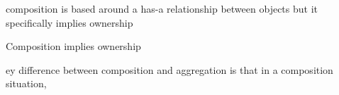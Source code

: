 composition is based around a has-a relationship between objects but it specifically implies ownership

Composition implies ownership

ey difference between composition and aggregation is that in a composition situation,